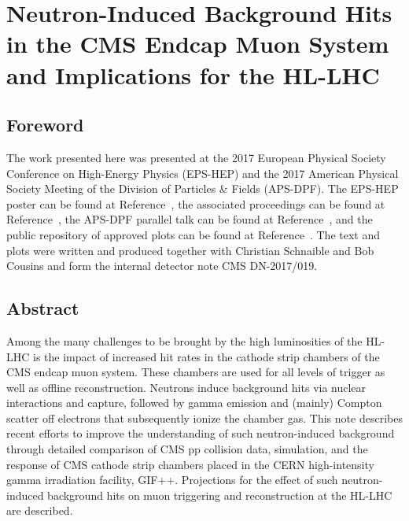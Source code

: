 \chapter{Neutron-Induced Background Hits in the CMS Endcap Muon System and Implications for the HL-LHC}
\label{chap:neutron}
\setcounter{secnumdepth}{-2}
\section{Foreword}
\vspace*{-0.5\baselineskip}
The work presented here was presented at the 2017 European Physical Society Conference on High-Energy Physics (EPS-HEP) and the 2017 American Physical Society Meeting of the Division of Particles \& Fields (APS-DPF). The EPS-HEP poster can be found at Reference~\cite{Dasgupta:Poster}, the associated proceedings can be found at Reference~\cite{Dasgupta:Proceedings}, the APS-DPF parallel talk can be found at Reference~\cite{Schnaible:Talk}, and the public repository of approved plots can be found at Reference~\cite{NeutronTwiki}. The text and plots were written and produced together with Christian Schnaible and Bob Cousins and form the internal detector note CMS DN-2017/019.

\section{Abstract}
\vspace*{-0.5\baselineskip}
Among the many challenges to be brought by the high luminosities of the HL-LHC is the impact of increased hit rates in the cathode strip chambers of the CMS endcap muon system. These chambers are used for all levels of trigger as well as offline reconstruction. Neutrons induce background hits via nuclear interactions and capture, followed by gamma emission and (mainly) Compton scatter off electrons that subsequently ionize the chamber gas. This note describes recent efforts to improve the understanding of such neutron-induced background through detailed comparison of CMS pp collision data, \GEANTfour simulation, and the response of CMS cathode strip chambers placed in the CERN high-intensity gamma irradiation facility, GIF++. Projections for the effect of such neutron-induced background hits on muon triggering and reconstruction at the HL-LHC are described.

\setcounter{secnumdepth}{1}
